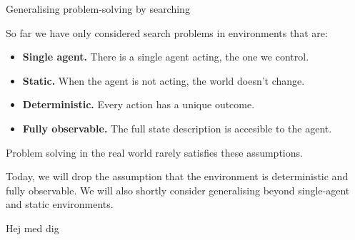 \documentclass[aspectratio=169,hyperref={pdfpagelabels=false}]{beamer}
\begin{document}
\begin{frame}{Generalising problem-solving by searching}

So far we have only considered search problems in environments that are:
\begin{itemize}
    \item \textbf{Single agent.} There is a single agent acting, the one we control.
    \item \textbf{Static.} When the agent is not acting, the world doesn't change.
    \item \textbf{Deterministic.} Every action has a unique outcome.
    \item \textbf{Fully observable.} The full state description is accesible to the agent.
\end{itemize}
Problem solving in the real world rarely satisfies these assumptions.

Today, we will drop the assumption that the environment is deterministic and fully observable. We will also shortly consider generalising beyond single-agent and static environments.

\end{frame}

\begin{frame}{Hej}
    med dig
\end{frame}
\end{document}
